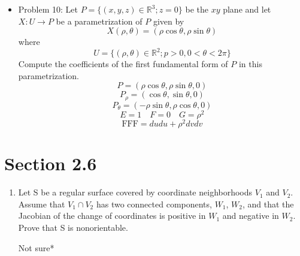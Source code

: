 \documentclass[a4paper,17pt]{extarticle}
\theoremstyle{definition}
\renewcommand{\skip}{\par\null\par}
\newcommand{\R}{\mathbb{R}}
\begin{document}
\begin{itemize}
\begin{proof}
    Again, similarly, $$\frac{\partial G}{\partial u}=0$$ implies $$\int_{v_1}^{v_2}||X_v(u_1,t)||dt=\int_{u_1}^{u_2}\sqrt{G(t)}dt=\int_{u_1}^{u_2}||X_v(u_2,t)||dt$$
    \end{proof}
    \item Problem 10: Let $P=\{(x,y,z)\in\R^3;z=0\}$ be the $xy$ plane and let $X:U\to P$ be a parametrization of $P$ given by $$X(\rho,\theta)=(\rho\cos\theta,\rho\sin\theta)$$ where $$U=\{(\rho,\theta)\in\R^2;p>0,0<\theta<2\pi\}$$
    Compute the coefficients of the first fundamental form of $P$ in this parametrization. $$P=(\rho\cos\theta,\rho\sin\theta,0)$$ $$P_{\rho}=(\cos\theta,\sin\theta,0)$$ $$P_{\theta}=(-\rho\sin\theta,\rho\cos\theta,0)$$ $$E=1\quad F=0\quad G=\rho^2$$ $$\text{FFF}=dudu+\rho^2dvdv$$
\end{itemize}
\section{Section 2.6}
\begin{enumerate}
    \item  Let S be a regular surface covered by coordinate neighborhoods $V_1$ and $V_2$. Assume that $V_1\cap V_2$ has two connected components, $W_1$, $W_2$, and that the Jacobian of the change of coordinates is positive in $W_1$ and negative in $W_2$. Prove that S is nonorientable. 
    \skip *Not sure*
\end{enumerate}
\end{document}
